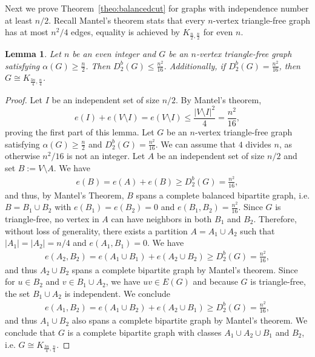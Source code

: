 \documentclass[11pt]{article}
\newtheorem{lemma}[theo]{Lemma}
\theoremstyle{definition}
\numberwithin{theo}{section}
\begin{document}
Next we prove Theorem~\ref{theo:balancedcut} for graphs with independence number at least $n/2$. 
Recall Mantel's theorem stats that every $n$-vertex triangle-free graph has at most $n^2/4$ edges, equality is achieved by $K_{\frac{n}2,\frac{n}2}$ for even $n$.
\begin{lemma}
\label{lem: ind}
Let $n$ be an even integer and $G$ be an $n$-vertex triangle-free graph satisfying $\alpha(G)\geq \frac{n}{2}$. Then $D_2^b(G)\leq \frac{n^2}{16}$.
Additionally, if $D_2^b(G)=\frac{n^2}{16}$, then $G\cong K_{\frac{3n}{4},\frac{n}{4}}$. 
\end{lemma}
\begin{proof}
Let $I$ be an independent set of size $n/2$. By Mantel's theorem,
\begin{equation}
    e(I)+e(V\setminus I)=e(V\setminus I)\leq \frac{|V\setminus I|^2}{4}=\frac{n^2}{16},
\end{equation}
proving the first part of this lemma. Let $G$ be an $n$-vertex triangle-free graph satisfying $\alpha(G)\geq \frac{n}{2}$ and $D_2^b(G)=\frac{n^2}{16}$. We can assume that $4$ divides $n$, as otherwise $n^2/16$ is not an integer. 
Let $A$ be an independent set of size $n/2$ and set $B:=V\setminus A$. We have
\begin{align*}
    e(B)=e(A)+e(B)\geq D_2^b(G)=\frac{n^2}{16},
\end{align*}
and thus, by Mantel's Theorem, $B$ spans a complete balanced bipartite graph, i.e. $B=B_1\cup B_2$ with $e(B_1)=e(B_2)=0$ and $e(B_1,B_2)=\frac{n^2}{16}$. Since $G$ is triangle-free, no vertex in $A$ can have neighbors in both $B_1$ and $B_2$. Therefore, without loss of generality, there exists a partition $A=A_1\cup A_2$ such that $|A_1|=|A_2|=n/4$ and $e(A_1,B_1)=0$. We have 
\begin{align*}
    e(A_2,B_2)=e(A_1\cup B_1)+e(A_2\cup B_2)\geq D_2^b(G)=\frac{n^2}{16},
\end{align*}
and thus $A_2\cup B_2$ spans a complete bipartite graph by Mantel's theorem. Since for $u\in B_2$ and $v\in B_1\cup A_2$, we have $uv\in E(G)$ and because $G$ is triangle-free, the set $B_1 \cup A_2$ is independent. We conclude
\begin{align*}
    e(A_1,B_2)=e(A_1\cup B_2)+e(A_2\cup B_1)\geq D_2^b(G)=\frac{n^2}{16},
\end{align*}
and thus $A_1\cup B_2$ also spans a complete bipartite graph by Mantel's theorem. We conclude that $G$ is a complete bipartite graph with classes $A_1\cup A_2\cup B_1$ and $B_2$, i.e. $G\cong K_{\frac{3n}{4},\frac{n}{4}}$.
\end{proof}
\end{document}
